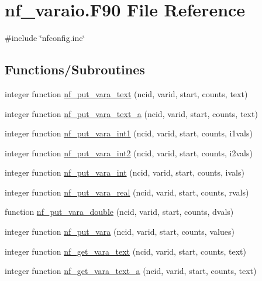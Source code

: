 \hypertarget{nf__varaio_8F90}{}\section{nf\+\_\+varaio.\+F90 File Reference}
\label{nf__varaio_8F90}
{\ttfamily \#include \char`\"{}nfconfig.\+inc\char`\"{}}\newline
\subsection*{Functions/\+Subroutines}
\begin{DoxyCompactItemize}
\item 
integer function \hyperlink{nf__varaio_8F90_a582dd86e95ea89b621ae3bdac16b0961}{nf\+\_\+put\+\_\+vara\+\_\+text} (ncid, varid, start, counts, text)
\item 
integer function \hyperlink{nf__varaio_8F90_a06ecd750696650b2ff2d1e8c5f7a9809}{nf\+\_\+put\+\_\+vara\+\_\+text\+\_\+a} (ncid, varid, start, counts, text)
\item 
integer function \hyperlink{nf__varaio_8F90_a2fbb5c5ffd0ed04601345f3eb7084193}{nf\+\_\+put\+\_\+vara\+\_\+int1} (ncid, varid, start, counts, i1vals)
\item 
integer function \hyperlink{nf__varaio_8F90_aa79663ed582deecc83cc5b00a4c68249}{nf\+\_\+put\+\_\+vara\+\_\+int2} (ncid, varid, start, counts, i2vals)
\item 
integer function \hyperlink{nf__varaio_8F90_a235e77681111d14023a2a4138544850c}{nf\+\_\+put\+\_\+vara\+\_\+int} (ncid, varid, start, counts, ivals)
\item 
integer function \hyperlink{nf__varaio_8F90_aa114940bfd72bbafd6c3fe900381a29a}{nf\+\_\+put\+\_\+vara\+\_\+real} (ncid, varid, start, counts, rvals)
\item 
function \hyperlink{nf__varaio_8F90_a5ff3341e2b0836cdc1c41206e1c39bb9}{nf\+\_\+put\+\_\+vara\+\_\+double} (ncid, varid, start, counts, dvals)
\item 
integer function \hyperlink{nf__varaio_8F90_abfdeb32ad7149e1e1664dd4234b780c8}{nf\+\_\+put\+\_\+vara} (ncid, varid, start, counts, values)
\item 
integer function \hyperlink{nf__varaio_8F90_ace29ec4368a5f1bf032b1b0516d28b04}{nf\+\_\+get\+\_\+vara\+\_\+text} (ncid, varid, start, counts, text)
\item 
integer function \hyperlink{nf__varaio_8F90_a65577db7879ba6687ddd5a803d0887c1}{nf\+\_\+get\+\_\+vara\+\_\+text\+\_\+a} (ncid, varid, start, counts, text)

\end{DoxyCompactItemize}
